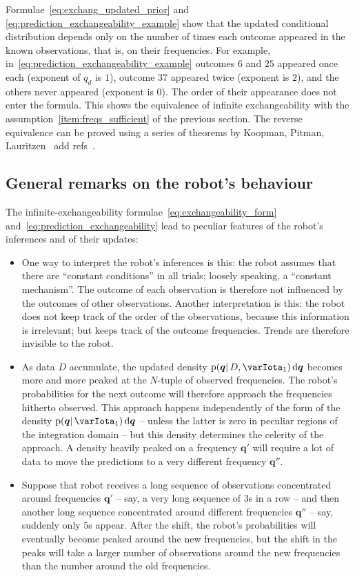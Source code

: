\documentclass[\ifafour a4paper,12pt,\else a5paper,10pt,\fi%
onecolumn,oneside,article,%
british%
]{memoir}
\theoremstyle{remark}
\theoremstyle{innote}
\newcommand*{\di}{\mathrm{d}}%
\newcommand*{\pf}{\mathrm{p}}%
\renewcommand*{\|}{\mathpunct{|}}
\newcommand*{\puzzle}{\maltese}
\newcommand{\mynote}[1]{ {\color{notecolour}\puzzle\ #1\ }}
\newcommand*{\yqq}{q}
\newcommand*{\yq}{\bm{\yqq}}
\newcommand*{\yI}{\varIota}
\newcommand*{\yMJ}{\yI_1}
\begin{document}
Formulae~\eqref{eq:exchang_updated_prior} and
\eqref{eq:prediction_exchangeability_example} show that the updated
conditional distribution depends only on the number of times each outcome
appeared in the known observations, that is, on their frequencies. For
example, in~\eqref{eq:prediction_exchangeability_example} outcomes $6$ and
$25$ appeared once each (exponent of $\yqq_d$ is $1$), outcome $37$
appeared twice (exponent is $2$), and the others never appeared (exponent
is $0$). The order of their appearance does not enter the formula. This
shows the equivalence of infinite exchangeability with the
assumption~\ref{item:freqs_sufficient} of the previous section. The reverse
equivalence can be proved using a series of theorems by Koopman, Pitman,
Lauritzen\mynote{add refs}. \textcolor{white}{If you find this you can
  claim a postcard from me.}
%



\subsection{General remarks on the robot's behaviour}
\label{sec:remarks}

The infinite-exchangeability formulae~\eqref{eq:exchangeability_form}
and~\eqref{eq:prediction_exchangeability} lead to peculiar features of the
robot's inferences and of their updates:
\begin{itemize}
\item One way to interpret the robot's inferences is this: the robot
  assumes that there are \enquote{constant conditions} in all trials;
  loosely speaking, a \enquote{constant mechanism}. The outcome of each
  observation is therefore not influenced by the outcomes of other
  observations. Another interpretation is this: the robot does not keep
  track of the order of the observations, because this information is
  irrelevant; but keeps track of the outcome frequencies. Trends are
  therefore invisible to the robot.
\item As data $D$ accumulate, the updated density
  $\pf(\yq \| D, \yMJ)\,\di\yq$ becomes more and more peaked at the
  $N$-tuple of observed frequencies. The robot's probabilities for the next
  outcome will therefore approach the frequencies hitherto observed. This
  approach happens independently of the form of the density
  $\pf(\yq \| \yMJ)\,\di\yq$ -- unless the latter is zero in peculiar
  regions of the integration domain -- but this density determines the
  celerity of the approach. A density heavily peaked on a frequency $\yq'$
  will require a lot of data to move the predictions to a very different
  frequency $\yq''$.
\item Suppose that robot receives a long sequence of observations
  concentrated around frequencies $\yq'$ -- say, a very long sequence of
  $3$s in a row -- and then another long sequence concentrated around
  different frequencies $\yq''$ -- say, suddenly only $5$s appear. After
  the shift, the robot's probabilities will eventually become peaked around
  the new frequencies, but the shift in the peaks will take a larger number
  of observations around the new frequencies than the number around the old
  frequencies.
\end{itemize}
\end{document}
